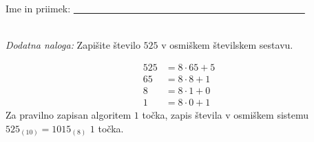 \documentclass[addpoints]{exam}
\begin{document}
\begin{questions}
\begin{parts}
    
    

        \end{parts}








     \newpage

     \noindent Ime in priimek: \underline{~~~~~~~~~~~~~~~~~~~~~~~~~~~~~~~~~~~~~~~~~~~~~~~~}

     ~\\

    \bonusquestion[2]
    \textit{Dodatna naloga:} Zapišite število $525$ v osmiškem številskem sestavu.

    \begin{solution}[7cm]
        \begin{align*}
            525 &= 8\cdot 65 + 5 \\
            65 &= 8\cdot 8 + 1 \\
            8 &= 8\cdot 1 + 0 \\
            1 &= 8\cdot 0 + 1
        \end{align*}
        Za pravilno zapisan algoritem $1$ točka, zapis števila v osmiškem sistemu $525_{(10)}=1015_{(8)}$ $1$ točka.
    \end{solution}





\end{questions}
\end{document}
